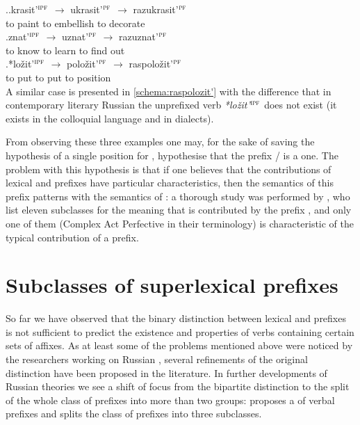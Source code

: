 \ex.\ag.\label{schema:razukrasit'}krasit'$^{\textsc{ipf}}$ {$\rightarrow$} ukrasit'$^{\textsc{pf}}$ {$\rightarrow$} razukrasit'$^{\textsc{pf}}$\\
{to paint} {} {to embellish} {} {to decorate}\\
\bg.\label{schema:razuznat'}znat'$^{\textsc{ipf}}$ {$\rightarrow$} uznat'$^{\textsc{pf}}$ {$\rightarrow$} razuznat'$^{\textsc{pf}}$\\
{to know} {} {to learn} {} {to find out}\\
\bg.*lo\v{z}it'$^{\textsc{ipf}}$ {$\rightarrow$} polo\v{z}it'$^{\textsc{pf}}$ {$\rightarrow$} raspolo\v{z}it'$^{\textsc{pf}}$\label{schema:raspolozit'}\\
{to put} {} {to put} {} {to position}\\

A similar case is presented in \ref{schema:raspolozit'}
with the difference that in contemporary literary Russian the unprefixed verb \textit{*lo\v{z}it'}$^{\textsc{ipf}}$ does not exist (it exists in the colloquial language and in dialects). 

From observing these three examples one may, for the sake of saving the hypothesis of a single position for , hypothesise that the prefix \mbox{/} is a  one. The problem with this hypothesis is that if one believes that the contributions of lexical and  prefixes have particular characteristics, then the semantics of this prefix patterns with the semantics of : a thorough study was performed by \citet{JandaNesset:10}, who list eleven subclasses for the meaning that is contributed by the prefix , and only one of them (Complex Act Perfective in their terminology) is characteristic of the typical contribution of a  prefix.


\section{Subclasses of superlexical prefixes}\label{section:subclasses}
So far we have observed that the binary distinction between lexical and  prefixes is not sufficient to predict the existence and properties of verbs containing certain sets of affixes. As at least some of the problems mentioned above were noticed by the researchers working on Russian , several refinements of the original distinction have been proposed in the literature. In further developments of Russian  theories we see a shift of focus from the bipartite distinction to the split of the whole class of prefixes into more than two groups: \citet{Tatevosov:07} proposes a  of verbal prefixes and \citet{Tatevosov:09} splits the class of  prefixes into three subclasses.

